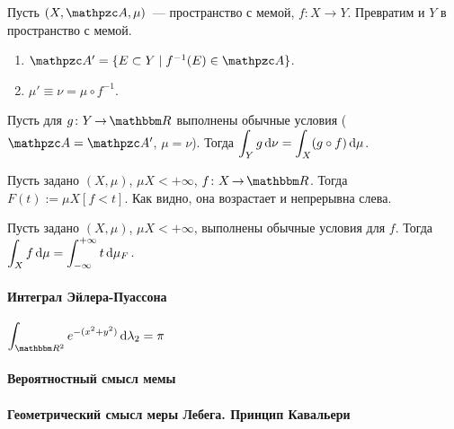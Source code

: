 \documentclass[12pt, timbord]{longnotes}
\begin{document}
\begin{defn}\label{defn:meas::lebstil::imag}
  Пусть $(X,\alg,\mu)$~--- пространство с мемой, $f\colon X \to Y$. 
  Превратим и $Y$ в пространство с мемой.
  \begin{enumerate}
    \item $\alg' = \{E \subset Y \mid f^{-1} (E) \in \alg\}$.
    \item $\mu' \equiv \nu = \mu \circ f^{-1} $.
  \end{enumerate}
\end{defn}

\begin{thrm}\label{thrm:meas::lebstil::imfun}
  Пусть для $g\colon Y \to \R$ выполнены обычные условия ($\alg = \alg'$, $\mu=\nu$).
  Тогда $\displaystyle \int_Y g \, \mathrm{d} \nu  = \int_X (g \circ f)\, \mathrm{d} \mu$.
\end{thrm}

\begin{defn}\label{defn:meas::lebstil::distr}
  Пусть задано $(X, \mu)$, $\mu X < + \infty$, $f\colon X \to \R$. Тогда
  $F(t) := \mu X  [f <t]$. Как видно, она возрастает и непрерывна слева.
\end{defn}

\begin{thrm}\label{thrm:meas::lebstil::distint}
  Пусть задано $(X, \mu)$, $\mu X < + \infty$, выполнены обычные условия для $f$.
  Тогда $\displaystyle \int_X f \, \mathrm{d} \mu = \int_{-\infty}^{+\infty} t \, \mathrm{d} \mu_F$.
\end{thrm}

\paragraph{Интеграл Эйлера-Пуассона}
\label{par:meas::eulpuass}

\begin{prop}\label{prop:meas::eulpuass}
  $\displaystyle \int_{\R^2} e^{-(x^2 + y^2)}\, \del \lambda_2 = \pi $ 
\end{prop}

\paragraph{Вероятностный смысл мемы}
\label{par:meas::prob}


\paragraph{Геометрический смысл меры Лебега. Принцип Кавальери}
\label{par:meas::geomleb}
\end{document}
